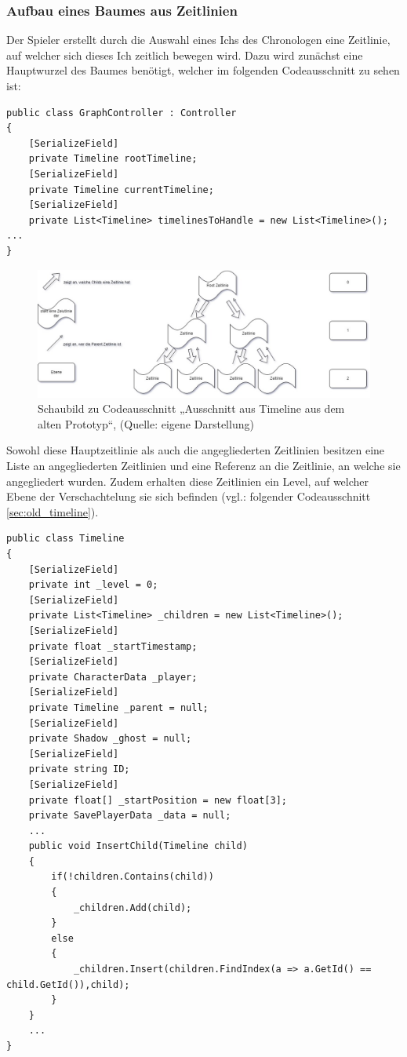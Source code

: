 \subsubsection{Aufbau eines Baumes aus Zeitlinien}\label{sec:good_01}
Der Spieler erstellt durch die Auswahl eines Ichs des Chronologen eine Zeitlinie, auf welcher sich dieses Ich zeitlich bewegen wird. Dazu wird zunächst eine Hauptwurzel des Baumes benötigt, welcher im folgenden Codeausschnitt zu sehen ist:
\begin{lstlisting}[caption={Ausschnitt aus GraphController aus dem alten Prototypen}, label={sec:old_graphController}]
public class GraphController : Controller
{
    [SerializeField]
    private Timeline rootTimeline;
    [SerializeField]
    private Timeline currentTimeline;
    [SerializeField]
    private List<Timeline> timelinesToHandle = new List<Timeline>();
...
}
\end{lstlisting}
\label{sec:rootTimeline_pld}

\begin{figure}[ht]
\centering
\includegraphics[width=1\linewidth]{content/pictures/Schaubild Timeline.jpg}
\caption{Schaubild zu Codeausschnitt „Ausschnitt aus Timeline aus dem alten Prototyp“, (Quelle: eigene Darstellung)}
\label{fig:codesnippet_timeline}
\end{figure}

Sowohl diese Hauptzeitlinie als auch die angegliederten Zeitlinien besitzen eine Liste an angegliederten Zeitlinien und eine Referenz an die Zeitlinie, an welche sie angegliedert wurden. Zudem erhalten diese Zeitlinien ein Level, auf welcher Ebene der Verschachtelung sie sich befinden (vgl.: folgender Codeausschnitt \ref{sec:old_timeline}).

\begin{lstlisting}[caption={Ausschnitt aus Timeline aus dem alten Prototyp}, label={sec:old_timeline}]
public class Timeline
{
    [SerializeField]
    private int _level = 0;
    [SerializeField]
    private List<Timeline> _children = new List<Timeline>();
    [SerializeField]
    private float _startTimestamp;
    [SerializeField]
    private CharacterData _player;
    [SerializeField]
    private Timeline _parent = null;
    [SerializeField]
    private Shadow _ghost = null;
    [SerializeField]
    private string ID;
    [SerializeField]
    private float[] _startPosition = new float[3];
    private SavePlayerData _data = null;
    ...
    public void InsertChild(Timeline child)
    {
        if(!children.Contains(child))
        {
            _children.Add(child);
        }
        else
        {
            _children.Insert(children.FindIndex(a => a.GetId() == child.GetId()),child);
        }
    }
    ...
}
\end{lstlisting}

